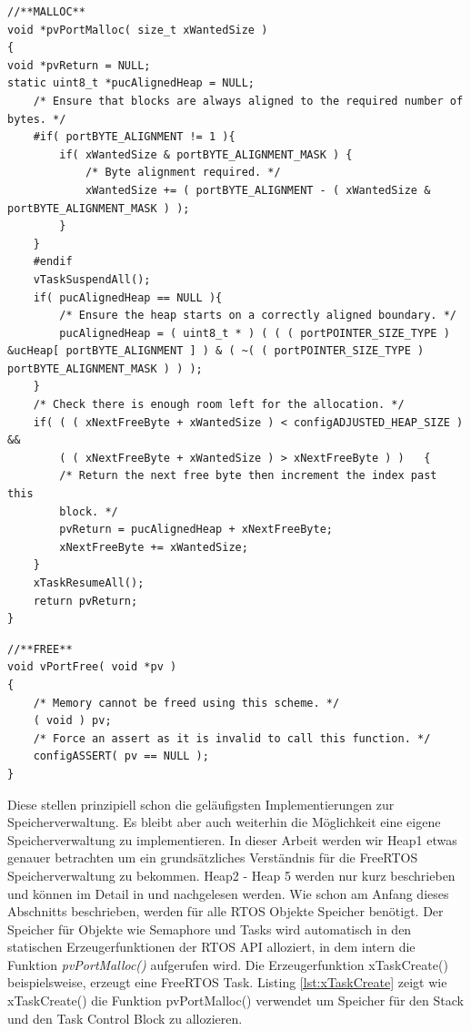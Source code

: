 \begin{lstlisting}[caption={FreeRTOS Source von pvPortMalloc() aus Heap1.c. Zuerst wird sichergestellt das die Startspeicheradresse dem byte-Alignment des $\mu$\-Pro\-zesso\-rs entspricht. Der STM32F4 ist ein 32Bit $\mu$\-Pro\-zesso\-r und hat ein byte-Alignment von 4, so dass die Startadresse immer eine Potenz von 4 sein muss. Danach wird der Scheduler deaktiviert und geprüft ob genug Speicher zur Verfügung steht. Abschließend wird der Speicher im ucHeap reserviert.  }, linewidth=8cm,captionpos=b, label=lst:malloc2, float=hbt]
//**MALLOC**
void *pvPortMalloc( size_t xWantedSize )
{
void *pvReturn = NULL;
static uint8_t *pucAlignedHeap = NULL;
	/* Ensure that blocks are always aligned to the required number of bytes. */
	#if( portBYTE_ALIGNMENT != 1 ){
		if( xWantedSize & portBYTE_ALIGNMENT_MASK )	{
			/* Byte alignment required. */
			xWantedSize += ( portBYTE_ALIGNMENT - ( xWantedSize & portBYTE_ALIGNMENT_MASK ) );
		}
	}
	#endif
	vTaskSuspendAll();
	if( pucAlignedHeap == NULL ){
		/* Ensure the heap starts on a correctly aligned boundary. */
		pucAlignedHeap = ( uint8_t * ) ( ( ( portPOINTER_SIZE_TYPE ) &ucHeap[ portBYTE_ALIGNMENT ] ) & ( ~( ( portPOINTER_SIZE_TYPE ) portBYTE_ALIGNMENT_MASK ) ) );
	}
	/* Check there is enough room left for the allocation. */
	if( ( ( xNextFreeByte + xWantedSize ) < configADJUSTED_HEAP_SIZE ) &&
		( ( xNextFreeByte + xWantedSize ) > xNextFreeByte )	)	{
		/* Return the next free byte then increment the index past this
		block. */
		pvReturn = pucAlignedHeap + xNextFreeByte;
		xNextFreeByte += xWantedSize;
	}
	xTaskResumeAll();
	return pvReturn;
}
\end{lstlisting}
\begin{lstlisting}[caption={FreeRTOS Source von vPortFree() aus Heap1.c . Da eine Speicherfreigabe in Heap1 nicht vorgesehen ist, ist diese Funktion leer.}, linewidth=8cm,captionpos=b, label=lst:free2, float=hbt]
//**FREE**
void vPortFree( void *pv )
{
	/* Memory cannot be freed using this scheme. */
	( void ) pv;
	/* Force an assert as it is invalid to call this function. */
	configASSERT( pv == NULL );
}
\end{lstlisting} 
Diese stellen prinzipiell schon die ge\-läu\-figsten Implementierungen zur Speicherverwaltung. Es bleibt aber auch weiterhin die Möglichkeit eine eigene Speicherverwaltung zu implementieren. In dieser Arbeit werden wir Heap1 etwas genauer betrachten um ein grund\-sätz\-liches Verständnis für die FreeRTOS Speicherverwaltung zu bekommen. Heap2 - Heap 5 werden nur kurz beschrieben und können im Detail in \cite{MasteringFreeRtos} und \cite{FreeRtosAdvanced} nachgelesen werden. Wie schon am Anfang dieses Abschnitts beschrieben, werden für alle RTOS Objekte Speicher benötigt. Der Speicher für Objekte wie Semaphore und Tasks wird automatisch in den statischen Erzeugerfunktionen der RTOS API alloziert, in dem intern die Funktion \textit{pvPortMalloc()} aufgerufen wird. Die Erzeugerfunktion xTaskCreate() beispielsweise, erzeugt eine FreeRTOS Task. Listing \ref{lst:xTaskCreate} zeigt wie xTaskCreate() die Funktion pvPortMalloc() verwendet um Speicher für den Stack und den Task Control Block zu allozieren.
